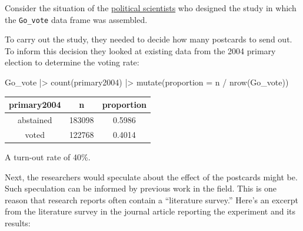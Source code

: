 \documentclass[
  letterpaper,
  DIV=11,
  numbers=noendperiod,
  oneside]{scrartcl}
\newenvironment{Shaded}{\begin{snugshade}}{\end{snugshade}}
\newcommand{\AttributeTok}[1]{\textcolor[rgb]{0.40,0.45,0.13}{#1}}
\newcommand{\FunctionTok}[1]{\textcolor[rgb]{0.28,0.35,0.67}{#1}}
\newcommand{\NormalTok}[1]{\textcolor[rgb]{0.00,0.23,0.31}{#1}}
\newcommand{\SpecialCharTok}[1]{\textcolor[rgb]{0.37,0.37,0.37}{#1}}
\begin{document}
\begin{tcolorbox}[enhanced jigsaw, colbacktitle=quarto-callout-note-color!10!white, opacityback=0, breakable, opacitybacktitle=0.6, colback=white, coltitle=black, arc=.35mm, title=\textcolor{quarto-callout-note-color}{\faInfo}\hspace{0.5em}{Example: Get out the vote!}, left=2mm, colframe=quarto-callout-note-color-frame, rightrule=.15mm, bottomrule=.15mm, leftrule=.75mm, bottomtitle=1mm, toptitle=1mm, titlerule=0mm, toprule=.15mm]

Consider the situation of the
\href{https://www.jstor.org/stable/pdf/27644496.pdf?refreqid=fastly-default\%3A49a08f68a9eef342acf59a9dc84ea5bd&ab_segments=&origin=&initiator=&acceptTC=1}{political
scientists} who designed the study in which the \texttt{Go\_vote} data
frame was assembled. {}

To carry out the study, they needed to decide how many postcards to send
out. To inform this decision they looked at existing data from the 2004
primary election to determine the voting rate:

\begin{Shaded}
\begin{Highlighting}[]
\NormalTok{Go\_vote }\SpecialCharTok{|\textgreater{}} \FunctionTok{count}\NormalTok{(primary2004) }\SpecialCharTok{|\textgreater{}}
  \FunctionTok{mutate}\NormalTok{(}\AttributeTok{proportion =}\NormalTok{ n }\SpecialCharTok{/} \FunctionTok{nrow}\NormalTok{(Go\_vote))}
\end{Highlighting}
\end{Shaded}

\begin{longtable}[]{@{}ccc@{}}
\toprule\noalign{}
primary2004 & n & proportion \\
\midrule\noalign{}
\endhead
\bottomrule\noalign{}
\endlastfoot
abstained & 183098 & 0.5986 \\
voted & 122768 & 0.4014 \\
\end{longtable}

A turn-out rate of 40\%.

Next, the researchers would speculate about the effect of the postcards
might be. Such speculation can be informed by previous work in the
field. This is one reason that research reports often contain a
``literature survey.'' Here's an excerpt from the literature survey in
the journal article reporting the experiment and its results:


\end{tcolorbox}
\end{document}
